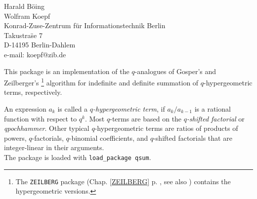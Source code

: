 \documentclass[11pt,letterpaper]{book}
\makeatletter
\newcommand{\underscore}{\_}
\newcommand{\ttindex}[1]{{\renewcommand{\_}{\protect\underscore}%
                          \index{#1@{\tt #1}}}}
\makeatother
\begin{document}
{\setcounter{redprompt}{0}}
\newcommand{\redprompt}{\stepcounter{redprompt}\theredprompt:}
\newenvironment{redoutput}{\small\begin{alltt}}{\end{alltt}\noindent{}}

{\footnotesize
\begin{center}
Harald B\"oing \\
Wolfram Koepf \\
Konrad-Zuse-Zentrum f\"ur Informationstechnik Berlin \\
Takustra\"se 7 \\
D-14195 Berlin-Dahlem \\
e-mail: koepf@zib.de
\end{center}
}
\ttindex{QSUM}


This package is an implementation of the $q$-analogues of Gosper's
and Zeilberger's
%
\footnote{The {\tt ZEILBERG} package (Chap. \ref{ZEILBERG}
p. \pageref{ZEILBERG}, see also \cite{Koepf:95})
contains the hypergeometric versions.}
%
algorithm for indefinite and definite summation of
$q$-hypergeometric terms, respectively.

An expression $a_k$ is called a {\sl $q$-hypergeometric term}, if
$a_{k}/a_{k-1}$ is a rational function with respect to $q^k$. Most
$q$-terms are based on the {\sl $q$-shifted factorial} or
{\sl qpochhammer}. Other typical $q$-hypergeometric terms are ratios
of products of powers, $q$-factorials, $q$-binomial coefficients, and
$q$-shifted factorials that are integer-linear in their arguments. \\
The package is loaded with {\tt load\_package qsum}.
\end{document}
